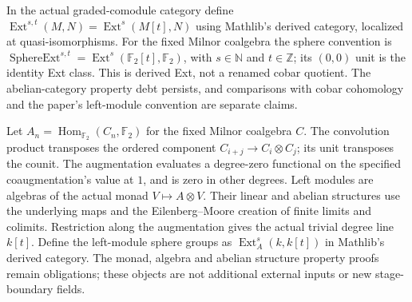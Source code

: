 \begin{definition}
  \label{def:milnor-derived-ext}
  \notready
  In the actual graded-comodule category define
  $\operatorname{Ext}^{s,t}(M,N)=\operatorname{Ext}^s(M[t],N)$ using
  Mathlib's derived category, localized at quasi-isomorphisms.
  For the fixed Milnor coalgebra the sphere convention is
  $\operatorname{SphereExt}^{s,t}=\operatorname{Ext}^s(\mathbb F_2[t],\mathbb F_2)$,
  with $s\in\mathbb N$ and $t\in\mathbb Z$; its $(0,0)$ unit is the
  identity Ext class. This is derived Ext, not a renamed cobar quotient.
  The abelian-category property debt persists, and comparisons with cobar
  cohomology and the paper's left-module convention are separate claims.
\end{definition}

\begin{definition}
  \label{def:milnor-left-module-ext}
  \notready
  Let $A_n=\operatorname{Hom}_{\mathbb F_2}(C_n,\mathbb F_2)$ for the
  fixed Milnor coalgebra $C$. The convolution product transposes the
  ordered component $C_{i+j}\to C_i\otimes C_j$; its unit transposes the
  counit. The augmentation evaluates a degree-zero functional on the
  specified coaugmentation's value at $1$, and is zero in other degrees.
  Left modules are algebras of the actual monad $V\mapsto A\otimes V$.
  Their linear and abelian structures use the underlying maps and the
  Eilenberg--Moore creation of finite limits and colimits. Restriction along
  the augmentation gives the actual trivial degree line $k[t]$. Define
  the left-module sphere groups as $\operatorname{Ext}_A^s(k,k[t])$ in
  Mathlib's derived category. The monad, algebra and abelian structure
  property proofs remain obligations; these objects are not additional
  external inputs or new stage-boundary fields.
\end{definition}

